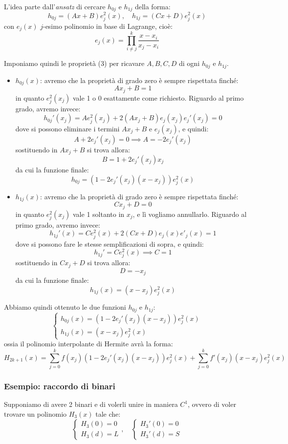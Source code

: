 \documentclass[a4paper,11pt]{article}
\begin{document}
L'idea parte dall'\textit{ansatz} di cercare $h_{0j}$ e $h_{1j}$ della forma:
$$
h_{0j} = (Ax + B) e_j^2(x), \quad h_{1j} = (Cx + D) e_j^2(x)
$$
con $e_j(x)$ $j$-esimo polinomio in base di Lagrange, cioè:
$$
e_j(x) = \prod_{i \neq j}^k \frac{x - x_i}{x_j - x_i}
$$

Imponiamo quindi le proprietà (3) per ricavare $A, B, C, D$ di ogni $h_{0j}$ e $h_{1j}$.
\begin{itemize}
	\item $h_{0j}(x)$: avremo che la proprietà di grado zero è sempre rispettata finché:
		$$
		A x_j + B = 1
		$$
		in quanto $e_j^2(x_j)$ vale 1 o 0 esattamente come richiesto.
		Riguardo al primo grado, avremo invece:
		$$
		h_{0j}'(x_j) = A e_j^2 (x_j) + 2 (A x_j + B) e_j(x_j) e_j'(x_j) = 0
		$$
		dove si possono eliminare i termini $A x_j + B$ e $e_j(x_j)$, e quindi:
		$$
		A + 2 e_j'(x_j) = 0 \implies A = - 2 e_j'(x_j) 
		$$
		sostituendo in $Ax_j + B$ si trova allora:
		$$
		B = 1 + 2 e_j'(x_j) x_j
		$$
		da cui la funzione finale:
		$$
		h_{0j} = \left( 1 - 2 e_j'(x_j) (x - x_j) \right) e_j^2(x)
		$$

	\item $h_{1j}(x)$: avremo che la proprietà di grado zero è sempre rispettata finché:
		$$
		C x_j + D = 0
		$$
		in quanto $e_j^2(x_j)$ vale 1 soltanto in $x_j$, e lì vogliamo annullarlo.
		Riguardo al primo grado, avremo invece:
		$$
		h_{1j}' (x) = C e_j^2 (x) + 2 (Cx + D) e_j(x) e'_j(x) = 1
		$$
		dove si possono fare le stesse semplificazioni di sopra, e quindi:
		$$
		h_{1j}' = C e_j^2(x) \implies C = 1
		$$
		sostituendo in $Cx_j + D$ si trova allora:
		$$
		D = - x_j
		$$
		da cui la funzione finale:
		$$
		h_{1j}(x) = (x - x_j) e^2_j(x)
		$$
\end{itemize}

Abbiamo quindi ottenuto le due funzioni $h_{0j}$ e $h_{1j}$:
$$
	\begin{cases}
		h_{0j}(x) = \left( 1 - 2 e_j'(x_j) (x - x_j) \right) e_j^2(x) \\
		h_{1j}(x) = (x - x_j) e^2_j(x)
	\end{cases}
$$
ossia il polinomio interpolante di Hermite avrà la forma:
$$
H_{2k + 1}(x) = \sum_{j = 0}^k f(x_j) \left( 1 - 2 e_j'(x_j)(x - x_j) \right) e_j^2(x) + \sum_{j = 0}^k f'(x_j) (x - x_j) e_j^2(x)
$$

\subsubsection{Esempio: raccordo di binari}
Supponiamo di avere 2 binari e di volerli unire in maniera $C^1$, ovvero di voler trovare un polinomio $H_3(x)$ tale che:
\[
	\begin{cases}
		H_3(0) = 0 \\
		H_3(d) = L
	\end{cases}, \quad
	\begin{cases}
		H_3'(0) = 0 \\
		H_3'(d) = S
	\end{cases} 
\]
\end{document}

